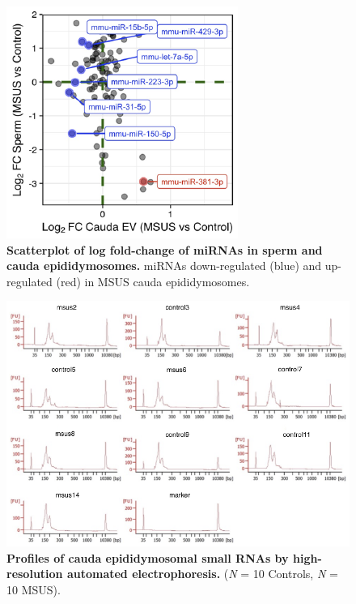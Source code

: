 \documentclass[12pt,twoside]{reedthesis}
\begin{document}
\begin{figure}[htbp]

{\centering \includegraphics{thesis_files/figure-latex/es3-1} 

}

\caption[Scatterplot of log fold-change of miRNAs in sperm and cauda epididymosomes]{\textbf{Scatterplot of log fold-change of miRNAs in sperm and cauda epididymosomes.} miRNAs down-regulated (blue) and up-regulated (red) in MSUS cauda epididymosomes.}\label{fig:es3}
\end{figure}

\begin{figure}[htbp]

{\centering \includegraphics{thesis_files/figure-latex/es4-1} 

}

\caption[Profiles of cauda epididymosomal small RNAs by high-resolution automated electrophoresis]{\textbf{Profiles of cauda epididymosomal small RNAs by high-resolution automated electrophoresis.} (\emph{N} = 10 Controls, \emph{N} = 10 MSUS).}\label{fig:es4}
\end{figure}
\end{document}
